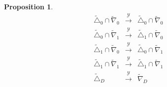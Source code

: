 \documentclass[12pt,oneside,openany]{article}
\newtheorem{prop}[theorem]{Proposition}
\begin{document}
\begin{prop}\label{internal symmetry}
\begin{eqnarray*}
 \tilde{\triangle}_0 \cap  \tilde{\nabla}_0 &\xrightarrow{\mathcal{Y}} &  \tilde{\triangle}_0 \cap  \tilde{\nabla}_0 \\
\tilde{\triangle}_0 \cap  \tilde{\nabla}_1 &\xrightarrow{\mathcal{Y}} &  \tilde{\triangle}_1 \cap  \tilde{\nabla}_0 \\
\tilde{\triangle}_1 \cap  \tilde{\nabla}_0 &\xrightarrow{\mathcal{Y}} &  \tilde{\triangle}_0 \cap  \tilde{\nabla}_1 \\
\tilde{\triangle}_1 \cap  \tilde{\nabla}_1 &\xrightarrow{\mathcal{Y}} &  \tilde{\triangle}_1 \cap  \tilde{\nabla}_1 \\
\tilde{\triangle}_D &\xrightarrow{\mathcal{Y}} &  \tilde{\nabla}_D \\
\end{eqnarray*}
\end{prop}
\end{document}
